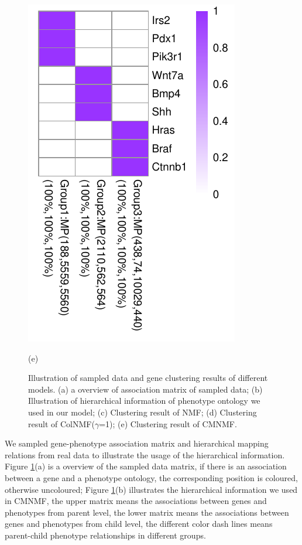 \documentclass{bmcart}
\begin{document}
\begin{figure}[!h]
\begin{minipage}{.3\linewidth}
   \includegraphics[width=\linewidth]{DrawPictures/v4.pdf}
    \centerline{(e)}
  \end{minipage}
  \caption{Illustration of sampled data and gene clustering results of different models. (a) a overview of
  association matrix of sampled data; (b) Illustration of hierarchical information
  of phenotype ontology we used in our model; (c) Clustering result of NMF; (d)
  Clustering result of ColNMF($\gamma$=1); (e) Clustering result of CMNMF.}
  \label{fig:sampled_result}
\end{figure}
 We sampled gene-phenotype association matrix and hierarchical mapping relations from real data to illustrate the usage of the hierarchical information. Figure \ref{fig:sampled_result}(a) is a overview of the sampled data matrix, if there is an association between a gene and a phenotype ontology, the corresponding position is coloured, otherwise uncoloured; Figure \ref{fig:sampled_result}(b) illustrates the hierarchical information we used in CMNMF, the upper matrix means the associations between genes and phenotypes from parent level, the lower matrix means the associations between genes and phenotypes from child level, the different color dash lines means parent-child phenotype relationships in different groups.
\end{document}
